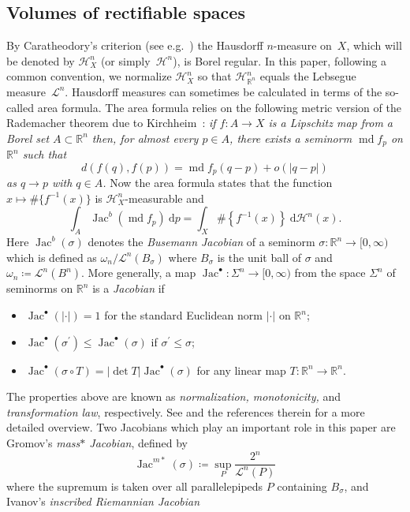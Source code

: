 \documentclass[reqno]{amsart}
\numberwithin{equation}{section}
\newcommand{\R}{\mathbb{R}}
\newcommand{\Ha}{\mathcal{H}}
\newcommand{\leb}{\mathcal{L}}
\newcommand{\Jac}{\operatorname{Jac}}
\newcommand{\md}{\operatorname{md}}
\newcommand{\abs}[1]{\lvert#1\rvert}
\begin{document}
\subsection{Volumes of rectifiable spaces}
\label{subsec:jacobians}
By Caratheodory's criterion (see e.g.\ \cite[p.\ 75]{fed69}) the Hausdorff $n$-measure on~$X$, which will be denoted by $\mathcal{H}^n_X$ (or simply~$\mathcal{H}^n$), is Borel regular. In this paper, following a common convention, we normalize $\Ha^n_X$ so that $\Ha^n_{\R^n}$ equals the Lebsegue measure~$\leb^n$. Hausdorff measures can sometimes be calculated in terms of the so-called area formula. The area formula relies on the following metric version of the Rademacher theorem due to Kirchheim~\cite{kir94}: \emph{if $f\colon A \to X$ is a Lipschitz map from a Borel set $A\subset \mathbb{R}^n$ then, for almost every $p\in A$, there exists a seminorm $\md f_p$ on $\mathbb{R}^n$ such that
\[
d(f(q),f(p))=\md f_p(q-p)+ o\left(|q-p|\right)
\]
as $q\to p$ with $q\in A$.} Now the area formula \cite{kir94} states that the function $x \mapsto \#\{f^{-1}(x)\}$ is $\mathcal{H}^n_X$-measurable and
\begin{equation}
\label{eq:area-formula}
\int_A \Jac^b(\md f_p) \ \textrm{d}p=\int_X \#\left\{f^{-1}(x)\right\}\ \textrm{d}\mathcal{H}^n(x).
\end{equation}
Here $\Jac^b(\sigma)$ denotes the \emph{Busemann Jacobian} of a seminorm $\sigma \colon \mathbb{R}^n\to [0,\infty)$ which is defined as  $\omega_n/ \mathcal{L}^n(B_\sigma)$ where $B_\sigma$ is the unit ball of $\sigma$ and \(\omega_n\coloneqq \leb^{n}(B^n)\). More generally, a map $\Jac^{\bullet}:\Sigma^n\to [0,\infty)$ from the space $\Sigma^n$ of seminorms on $\R^n$ is a \emph{Jacobian} if 
\begin{itemize}
	\item[(i)] $\Jac^\bullet(\abs{\cdot})=1$ for the standard Euclidean norm \(\abs{\cdot}\) on \(\R^n\); 
	\item[(ii)] $\Jac^\bullet(\sigma^\prime)\le \Jac^\bullet(\sigma)$ if $\sigma^\prime\le \sigma$;
	\item[(iii)] $\Jac^\bullet(\sigma\circ T)=|\det T|\Jac^\bullet(\sigma)$ for any linear map $T:\R^n\to\R^n$.
\end{itemize}
The properties above are known as \emph{normalization, monotonicity,} and \emph{transformation law}, respectively. See \cite[Section 4.1]{cre20} and the references therein for a more detailed overview. Two Jacobians which play an important role in this paper are  Gromov's \emph{mass\(*\) Jacobian}, defined by \[
\Jac^{m*}(\sigma)\coloneqq \sup_P \frac{2^n}{\mathcal{L}^n(P)}
\] where the supremum is taken over all parallelepipeds \(P\) containing $B_\sigma$, and Ivanov's \emph{inscribed Riemannian Jacobian}
\end{document}
